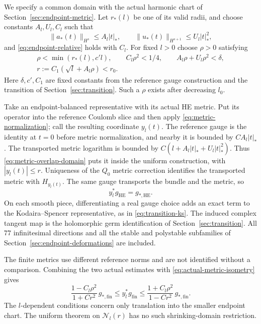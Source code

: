 \documentclass[11pt]{amsart}
\theoremstyle{definition}
\theoremstyle{remark}
\newcommand{\cN}{\mathcal N}
\begin{document}
We specify a common domain with the actual harmonic chart of
Section~\ref{sec:endpoint-metric}. Let $r_*(l)$ be one of its
valid radii, and choose constants $A_l,U_l,C_l$ such that
\[
 \|a_*(t)\|_{H^s}\le A_l|t|_*,\qquad
 \|u_*(t)\|_{H^{s+1}}\le U_l|t|_*^2,
\]
and \eqref{eq:endpoint-relative} holds with $C_l$.
For fixed $l>0$ choose $\rho>0$ satisfying
\begin{equation}\label{eq:metric-overlap-domain}
 \begin{gathered}
 \rho<\min(r_*(l),c'l),\qquad C_l\rho^2<1/4,\qquad
 A_l\rho+U_l\rho^2<\delta,\\
 r:=C_1(\sqrt l+A_l\rho)<r_0.
 \end{gathered}
\end{equation}
Here $\delta,c',C_1$ are fixed constants from the reference gauge
construction and the transition of Section~\ref{sec:transition}.
Such a $\rho$ exists after decreasing $l_0$.

Take an endpoint-balanced representative with its actual HE metric.
Put its operator into the reference Coulomb slice and then apply
\eqref{eq:metric-normalization}; call the resulting coordinate $y_l(t)$.
The reference gauge is the identity at $t=0$ before metric normalization,
and nearby it is bounded by $CA_l|t|_*$. The transported metric
logarithm is bounded by $C(l+A_l|t|_*+U_l|t|_*^2)$.
Thus \eqref{eq:metric-overlap-domain} puts it inside the uniform
construction, with $|y_l(t)|\le r$. Uniqueness of the $Q_0$ metric
correction identifies the transported metric with $H_{y_l(t)}$.
The same gauge transports the bundle and the metric, so
\begin{equation}\label{eq:actual-metric-isometry}
 y_l^*g_{\mathrm{HE}}=g_{*,\mathrm{HE}}.
\end{equation}
On each smooth piece, differentiating a real gauge choice adds an
exact term to the Kodaira--Spencer representative, as in
\eqref{eq:transition-ks}. The induced complex tangent map is the
holomorphic germ identification of Section~\ref{sec:transition}.
All $77$ infinitesimal directions and all the stable and polystable
subfamilies of Section~\ref{sec:endpoint-deformations} are included.

The finite metrics use different reference norms and are not identified
without a comparison. Combining the two actual estimates with
\eqref{eq:actual-metric-isometry} gives
\begin{equation}\label{eq:endpoint-finite-conversion}
 \frac{1-C_l\rho^2}{1+Cr^2}\,g_{*,\mathrm{fin}}
 \le y_l^*g_{\mathrm{fin}}
 \le\frac{1+C_l\rho^2}{1-Cr^2}\,g_{*,\mathrm{fin}}.
\end{equation}
The $l$-dependent conditions concern only translation into the smaller
endpoint chart. The uniform theorem on $\cN_l(r)$ has no such
shrinking-domain restriction.
\end{document}
